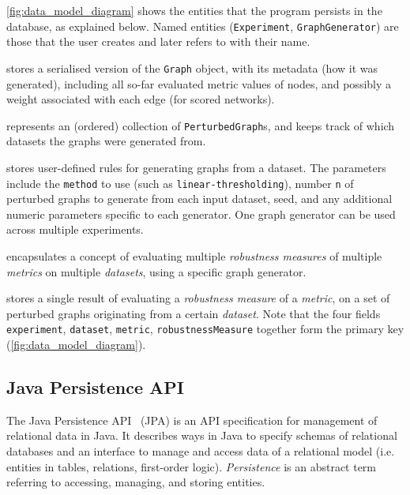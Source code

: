\autoref{fig:data_model_diagram} shows the entities that the program persists in the database, as explained below.
Named entities (\texttt{Experiment}, \texttt{GraphGenerator}) are those that the user creates and later refers to with their name.
\begin{description}[itemsep=\zerospace]
    \item[\texttt{PerturbedGraph}]
    stores a serialised version of the \texttt{Graph} object, with its metadata (how it was generated), including all so-far evaluated metric values of nodes, and possibly a weight associated with each edge (for scored networks).

    \item[\texttt{GraphCollection}]
    represents an (ordered) collection of \texttt{PerturbedGraph}s, and keeps track of which datasets the graphs were generated from.

    \item[\texttt{GraphGenerator}]
    stores user-defined rules for generating graphs from a dataset.
    The parameters include the \texttt{method} to use (such as \texttt{linear-thresholding}), number \texttt{n} of perturbed graphs to generate from each input dataset, seed, and any additional numeric parameters specific to each generator.
    One graph generator can be used across multiple experiments.

    \item[\texttt{Experiment}]
    encapsulates a concept of evaluating multiple \textsl{robustness measures} of multiple \textsl{metrics} on multiple \textsl{datasets}, using a specific graph generator.

    \item[\texttt{Robustness}]
    stores a single result of evaluating a \textsl{robustness measure} of a \textsl{metric}, on a set of perturbed graphs originating from a certain \textsl{dataset}.
    Note that the four fields \texttt{experiment}, \texttt{dataset}, \texttt{metric}, \texttt{robustnessMeasure} together form the primary key (\autoref{fig:data_model_diagram}).
\end{description}

\subsection{Java Persistence API}

The Java Persistence API~\cite{BiswasJavaPersistenceAPI2016} (JPA) is an API specification for management of relational data in Java.
It describes ways in Java to specify schemas of relational databases and an interface to manage and access data of a relational model (i.e. entities in tables, relations, first-order logic).
\textsl{Persistence} is an abstract term referring to accessing, managing, and storing entities.

